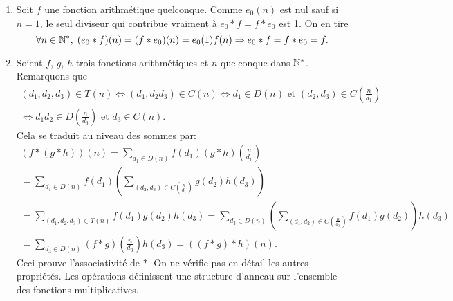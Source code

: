 \begin{enumerate}
\begin{enumerate}
 \item Soit $f$ une fonction arithmétique quelconque. Comme $e_0(n)$ est nul sauf si $n=1$, le seul diviseur qui contribue vraiment à $e_0*f = f*e_0$ est 1. On en tire
\begin{displaymath}
\forall n\in \mathbb{N}^*,\; (e_0*f)(n) = (f*e_0)(n) = e_0(1)f(n) \Rightarrow  e_0*f = f*e_0 = f .
\end{displaymath}
 
 \item Soient $f$, $g$, $h$ trois fonctions arithmétiques et $n$ quelconque dans $\mathbb{N}^*$. Remarquons que
\begin{multline*}
 (d_1,d_2,d_3)\in T(n) \Leftrightarrow (d_1,d_2d_3) \in C(n)
\Leftrightarrow d_1 \in D(n) \text{ et } (d_2,d_3)\in C(\frac{n}{d_1})\\
\Leftrightarrow d_1d_2 \in D(\frac{n}{d_3}) \text{ et } d_3\in C(n)  .
\end{multline*}
Cela se traduit au niveau des sommes par:
\begin{multline*}
 \left( f*(g*h)\right)(n) =  \sum_{d_1\in D(n)}f(d_1)(g*h)(\frac{n}{d_1})\\
= \sum_{d_1\in D(n)}f(d_1)\left( \sum_{(d_2,d_3)\in C(\frac{n}{d_1})}g(d_2)h(d_3)\right) \\
= \sum_{(d_1,d_2,d_3)\in T(n)}f(d_1)g(d_2)h(d_3)
= \sum_{d_3\in D(n)}\left( \sum_{(d_1,d_2)\in C(\frac{n}{d_3})}f(d_1)g(d_2)\right)h(d_3) \\
= \sum_{d_3\in D(n)}(f*g)(\frac{n}{d_3})h(d_3) = ((f*g)*h)(n).
\end{multline*}
Ceci prouve l'associativité de $*$. On ne vérifie pas en détail les autres propriétés. Les opérations définissent une structure d'anneau sur l'ensemble des fonctions multiplicatives.
\end{enumerate}


\end{enumerate}
